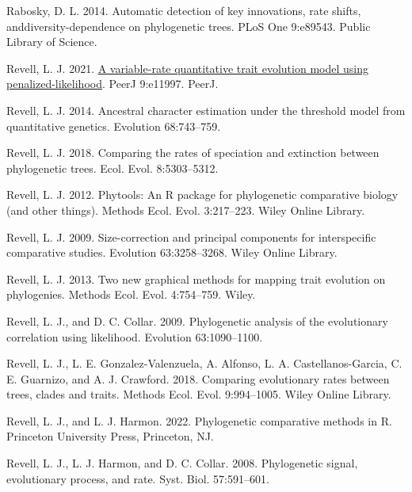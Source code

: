 \documentclass[fleqn,10pt,lineno]{wlpeerj} %
\newlength{\cslhangindent}
\newlength{\cslentryspacingunit} %
\newenvironment{CSLReferences}[2] %
 {%
  \setlength{\parindent}{0pt}
  \ifodd #1
  \let\oldpar\par
  \def\par{\hangindent=\cslhangindent\oldpar}
  \fi
  \setlength{\parskip}{#2\cslentryspacingunit}
 }%
 {}
\begin{document}
\begin{CSLReferences}{1}{0}
\leavevmode{}%
Rabosky, D. L. 2014. Automatic detection of key innovations, rate shifts, and{d}iversity-{d}ependence on phylogenetic trees. PLoS One 9:e89543. Public Library of Science.

\leavevmode{}%
Revell, L. J. 2021. \href{https://doi.org/10.7717/peerj.11997}{A variable-rate quantitative trait evolution model using penalized-likelihood}. {PeerJ} 9:e11997. {PeerJ}.

\leavevmode{}%
Revell, L. J. 2014. Ancestral character estimation under the threshold model from quantitative genetics. Evolution 68:743--759.

\leavevmode{}%
Revell, L. J. 2018. Comparing the rates of speciation and extinction between phylogenetic trees. Ecol. Evol. 8:5303--5312.

\leavevmode{}%
Revell, L. J. 2012. Phytools: An {R} package for phylogenetic comparative biology (and other things). Methods Ecol. Evol. 3:217--223. Wiley Online Library.

\leavevmode{}%
Revell, L. J. 2009. Size-correction and principal components for interspecific comparative studies. Evolution 63:3258--3268. Wiley Online Library.

\leavevmode{}%
Revell, L. J. 2013. Two new graphical methods for mapping trait evolution on phylogenies. Methods Ecol. Evol. 4:754--759. Wiley.

\leavevmode{}%
Revell, L. J., and D. C. Collar. 2009. Phylogenetic analysis of the evolutionary correlation using likelihood. Evolution 63:1090--1100.

\leavevmode{}%
Revell, L. J., L. E. Gonzalez-Valenzuela, A. Alfonso, L. A. Castellanos-Garcia, C. E. Guarnizo, and A. J. Crawford. 2018. Comparing evolutionary rates between trees, clades and traits. Methods Ecol. Evol. 9:994--1005. Wiley Online Library.

\leavevmode{}%
Revell, L. J., and L. J. Harmon. 2022. Phylogenetic comparative methods in {R}. Princeton University Press, Princeton, NJ.

\leavevmode{}%
Revell, L. J., L. J. Harmon, and D. C. Collar. 2008. Phylogenetic signal, evolutionary process, and rate. Syst. Biol. 57:591--601.


\end{CSLReferences}
\end{document}
